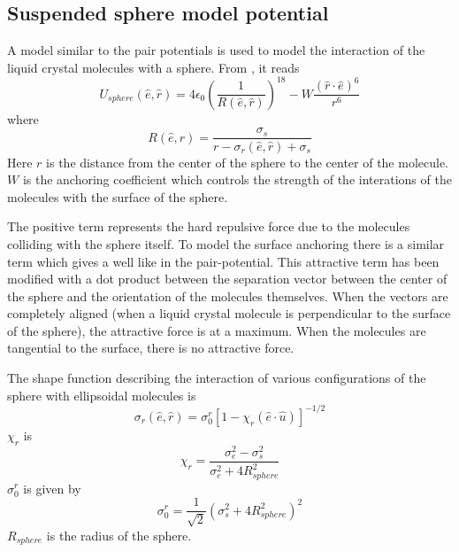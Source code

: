\documentclass[preprint, aps]{revtex4-1}
\begin{document}
\subsection*{Suspended sphere model potential}
A model similar to the pair potentials is used to model the interaction of the
liquid crystal molecules with a sphere. From \cite{lubensky98}, it reads
	\begin{equation} \label{sphere-pot}
		U_{sphere} (\hat{e}, \hat{r}) 
		= 4\epsilon_0 \left(\frac{1}{R(\hat{e}, \hat{r})}\right)^{18}
		- W\frac{
			(\hat{r}\cdot\hat{e})^6
			}
			{
			r^6
			}
	\end{equation}
where 
	\begin{equation}
		R(\hat{e}, \hat{r}) = 
		\frac{
			\sigma_s
		}
		{
			r - \sigma_r(\hat{e}, \hat{r}) + \sigma_s
		}
	\end{equation}
Here $r$ is the distance from the center of the sphere to the center of the
molecule. $W$ is the anchoring coefficient which controls the strength of the
interations of the molecules with the surface of the sphere.

The positive term represents the hard repulsive force due to the molecules 
colliding with the sphere itself. To model the surface anchoring there is a 
similar term which gives a well like in the pair-potential. This attractive term 
has been modified with a dot product between the separation vector between the 
center of the sphere and the orientation of the molecules themselves. When the 
vectors are completely aligned (when a liquid crystal molecule is perpendicular 
to the surface of the sphere), the attractive force is at a maximum. When the 
molecules are tangential to the surface, there is no attractive force.

The shape function describing the interaction of various configurations of the
sphere with ellipsoidal molecules is
	\begin{equation}
		\sigma_r(\hat{e}, \hat{r}) =
		\sigma_0^r\left[1-\chi_r(\hat{e} \cdot \hat{u})\right]^{-1/2}
	\end{equation}
$\chi_r$ is
	\begin{equation}
		\chi_r = 
		\frac{
			\sigma_e^2 - \sigma_s^2
		}
		{
			\sigma_e^2 + 4R_{sphere}^2
		}
	\end{equation}
$\sigma_0^r$ is given by
	\begin{equation}
		\sigma_0^r 
		= \frac{1}{\sqrt{2}}\left( \sigma_s^2 + 4R_{sphere}^2 \right)^2
	\end{equation}
	$R_{sphere}$ is the radius of the sphere. 
\end{document}
